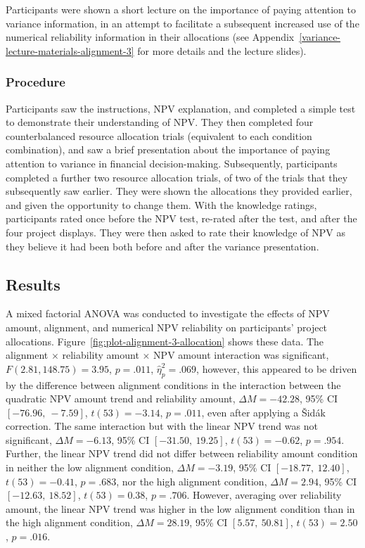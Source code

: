 \documentclass[a4paper, nobind, dvipsnames]{templates/ociamthesis}
\theoremstyle{definition}
\theoremstyle{definition}
\theoremstyle{definition}
\theoremstyle{definition}
\theoremstyle{remark}
\begin{document}
Participants were shown a short lecture on the importance of paying attention to
variance information, in an attempt to facilitate a subsequent increased use of
the numerical reliability information in their allocations (see
Appendix~\ref{variance-lecture-materials-alignment-3} for more details and the
lecture slides).

\hypertarget{procedure-alignment-3}{%
\subsubsection{Procedure}\label{procedure-alignment-3}}

Participants saw the instructions, NPV explanation, and completed a simple test
to demonstrate their understanding of NPV. They then completed four
counterbalanced resource allocation trials (equivalent to each condition
combination), and saw a brief presentation about the importance of paying
attention to variance in financial decision-making. Subsequently, participants
completed a further two resource allocation trials, of two of the trials that
they subsequently saw earlier. They were shown the allocations they provided
earlier, and given the opportunity to change them. With the knowledge ratings,
participants rated once before the NPV test, re-rated after the test, and after
the four project displays. They were then asked to rate their knowledge of NPV
as they believe it had been both before and after the variance presentation.

\subsection{Results}

A mixed factorial ANOVA was conducted to investigate the effects of NPV amount,
alignment, and numerical NPV reliability on participants' project allocations.
Figure~\ref{fig:plot-alignment-3-allocation} shows these data. The alignment
\(\times\) reliability amount \(\times\) NPV amount interaction was
significant,
\(F(2.81, 148.75) = 3.95\), \(p = .011\), \(\hat{\eta}^2_p = .069\),
however, this appeared to be driven by the difference between alignment
conditions in the interaction between the quadratic NPV amount trend and
reliability amount,
\(\Delta M = -42.28\), 95\% CI \([-76.96,~-7.59]\), \(t(53) = -3.14\), \(p = .011\), even after
applying a Šidák correction. The same interaction but with the linear NPV trend
was not significant,
\(\Delta M = -6.13\), 95\% CI \([-31.50,~19.25]\), \(t(53) = -0.62\), \(p = .954\). Further, the linear
NPV trend did not differ between reliability amount condition in neither the low
alignment condition, \(\Delta M = -3.19\), 95\% CI \([-18.77,~12.40]\), \(t(53) = -0.41\), \(p = .683\), nor
the high alignment condition,
\(\Delta M = 2.94\), 95\% CI \([-12.63,~18.52]\), \(t(53) = 0.38\), \(p = .706\). However, averaging over
reliability amount, the linear NPV trend was higher in the low alignment
condition than in the high alignment condition,
\(\Delta M = 28.19\), 95\% CI \([5.57,~50.81]\), \(t(53) = 2.50\), \(p = .016\).
\end{document}
